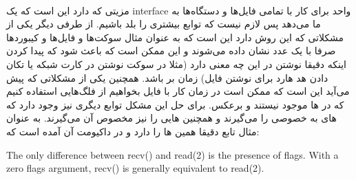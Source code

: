 \\
مزیتی که دارد این است که یک
interface
واحد برای کار با تمامی فایل‌ها و دستگاه‌ها به ما می‌دهد پس لازم نیست که توابع بیشتری را بلد باشیم.
از طرفی دیگر یکی از مشکلاتی که این روش دارد این است که به عنوان مثال سوکت‌ها و فایل‌ها و کیبورد‌ها صرفا با یک
عدد نشان داده می‌شوند و این ممکن است که باعث شود که پیدا کردن اینکه دقیقا نوشتن در این
چه معنی دارد
(مثلا در سوکت نوشتن در کارت شبکه یا تکان دادن هد هارد برای نوشتن فایل)
زمان بر باشد.
همچنین یکی از مشکلاتی که پیش می‌آید این است که ممکن است در زمان کار با فایل بخواهیم از فلگ‌هایی استفاده
کنیم که در
ها
موجود نیستند و برعکس. برای حل این مشکل توابع دیگری نیز وجود دارد که
های
به خصوصی را می‌گیرند و همچنین
هایی
را نیز مخصوص آن می‌گیرند.
به عنوان مثال تابع
دقیقا همین
ها
را دارد و در داکیومت آن آمده است که:

\begin{latin}
\noindent
    The only difference between recv() and read(2) is the presence of
    flags.  With a zero flags argument, recv() is generally
    equivalent to read(2).
\end{latin}








